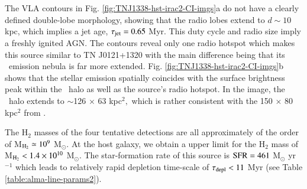 The VLA contours in Fig. \ref{fig:TNJ1338-hst-irac2-CI-imgs}a do not have a clearly defined double-lobe morphology, showing that the radio lobes extend to $d \sim10$ kpc, which implies a jet age, $\tau_{\rm jet} = 0.65$ Myr. This duty cycle and radio size imply a freshly ignited AGN. The contours reveal only one radio hotspot which makes this source similar to TN J0121+1320 with the main difference being that its \lya~emission nebula is far more extended. Fig. \ref{fig:TNJ1338-hst-irac2-CI-imgs}b shows that the stellar emission spatially coincides with the surface brightness peak within the \lya~halo as well as the source's radio hotspot. In the image, the \lya~halo extends to $\sim$126 $\times$ 63 kpc$^2,$ which is rather consistent with the 150 $\times$ 80 kpc$^2$ from \citet{swinbank2015}. 

The H$_2$ masses of the four tentative detections are all approximately of the order of M$_{\rm H_2} \simeq 10^{9}$ M$_\odot.$ At the host galaxy, we obtain a upper limit for the H$_2$ mass of M$_{\rm H_2} < 1.4\times 10^{10}$ M$_\odot.$ The star-formation rate of this source is $\rm SFR = 461$ M$_\odot$ yr$^{-1}$ which leads to relatively rapid depletion time-scale of $\tau_{\rm depl}<11$ Myr (see Table \ref{table:alma-line-params2}). 

